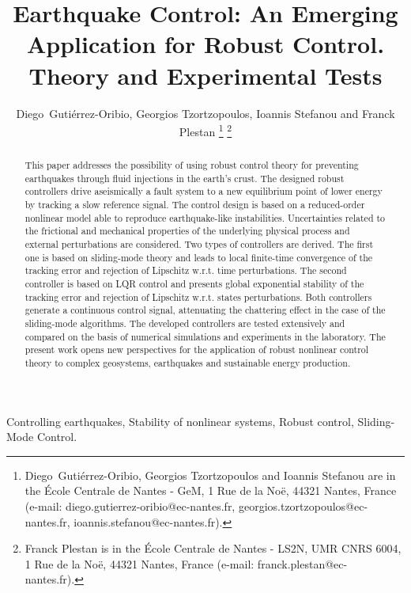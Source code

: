 \documentclass[journal,twoside,web]{ieeecolor}
\begin{document}
\title{Earthquake Control: An Emerging Application for Robust Control. Theory and Experimental Tests}

\author{Diego~Guti\'errez-Oribio, Georgios Tzortzopoulos, Ioannis Stefanou and Franck Plestan
\thanks{Diego~Guti\'errez-Oribio, Georgios Tzortzopoulos and Ioannis Stefanou are in the \'Ecole Centrale de Nantes - GeM, 1 Rue de la No\"e, 44321 Nantes, France (e-mail: diego.gutierrez-oribio@ec-nantes.fr, georgios.tzortzopoulos@ec-nantes.fr, ioannis.stefanou@ec-nantes.fr). }
\thanks{Franck Plestan is in the \'Ecole Centrale de Nantes - LS2N, UMR CNRS 6004, 1 Rue de la No\"e, 44321 Nantes, France (e-mail: franck.plestan@ec-nantes.fr).}}

\maketitle

\begin{abstract}
This paper addresses the possibility of using robust control theory for preventing earthquakes through fluid injections in the earth's crust. The designed robust controllers drive aseismically a fault system to a new equilibrium point of lower energy by tracking a slow reference signal. The control design is based on a reduced-order nonlinear model able to reproduce earthquake-like instabilities. Uncertainties related to the frictional and mechanical properties of the underlying physical process and external perturbations are considered. Two types of controllers are derived. The first one is based on sliding-mode theory and leads to local finite-time convergence of the tracking error and rejection of Lipschitz w.r.t. time perturbations. The second controller is based on LQR control and presents global exponential stability of the tracking error and rejection of Lipschitz w.r.t. states perturbations. Both controllers generate a continuous control signal, attenuating the chattering effect in the case of the sliding-mode algorithms. The developed controllers are tested extensively and compared on the basis of numerical simulations and experiments in the laboratory. The present work opens new perspectives for the application of robust nonlinear control theory to complex geosystems, earthquakes and sustainable energy production.
\end{abstract}

\begin{IEEEkeywords}
Controlling earthquakes, Stability of nonlinear systems, Robust control, Sliding-Mode Control.
\end{IEEEkeywords}
\end{document}
